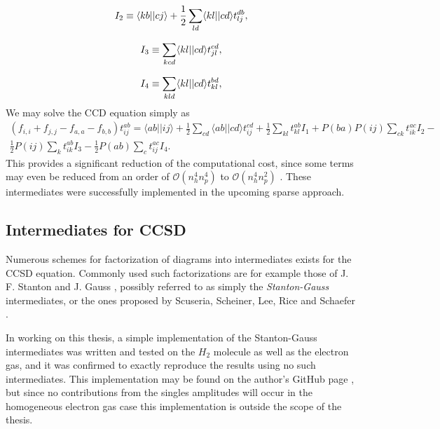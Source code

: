 \begin{equation}
I_2 \equiv \langle kb \vert \vert cj \rangle  + \frac{1}{2} \sum_{ld} \langle kl \vert \vert cd \rangle t_{lj}^{db},  \\
\end{equation}

\begin{equation}
I_3 \equiv \sum_{kcd} \langle kl \vert \vert cd \rangle t^{cd}_{jl},  \\
\end{equation}

\begin{equation}
I_4 \equiv \sum_{kld} \langle kl \vert \vert cd \rangle t^{bd}_{kl},  \\
\end{equation}
We may solve the CCD equation simply as
\begin{multline}
(f_{i,i} + f_{j,j} - f_{a,a} - f_{b,b})t^{ab}_{ij} =\langle ab \vert \vert ij \rangle + 
\frac{1}{2} \sum_{cd} \langle ab \vert \vert cd \rangle t_{ij}^{cd} +
\frac{1}{2} \sum_{kl} t^{ab}_{kl} I_1 +
P(ba)P(ij) \sum_{ck} t_{ik}^{ac} I_2 - \\
\frac{1}{2}P(ij) \sum_k t^{ab}_{ik} I_3 - 
\frac{1}{2}P(ab) \sum_c t^{ac}_{ij} I_4.
\end{multline}
This provides a significant reduction of the computational cost, since
some terms may even be reduced from an order of
$\mathcal{O}(n_h^4n_p^4)$ to $\mathcal{O}(n_h^4n_p^2)$
\cite{Baardsen2014}. These intermediates were successfully implemented
in the upcoming sparse approach.

\subsection{Intermediates for CCSD}

Numerous schemes for factorization of diagrams into intermediates
exists for the CCSD equation.  Commonly used such factorizations are
for example those of J. F. Stanton and J. Gauss \cite{Solomonik2013},
possibly referred to as simply the \emph{Stanton-Gauss} intermediates,
or the ones proposed by Scuseria, Scheiner, Lee, Rice and Schaefer
\cite{scuseria1987}.

In working on this thesis, a simple implementation of the
Stanton-Gauss intermediates was written and tested on the $H_2$
molecule as well as the electron gas, and it was confirmed to exactly
reproduce the results using no such intermediates. This implementation
may be found on the author's GitHub page \cite{fermicc}, but since no
contributions from the singles amplitudes will occur in the
homogeneous electron gas case \cite{Baardsen2014} this implementation
is outside the scope of the thesis.

